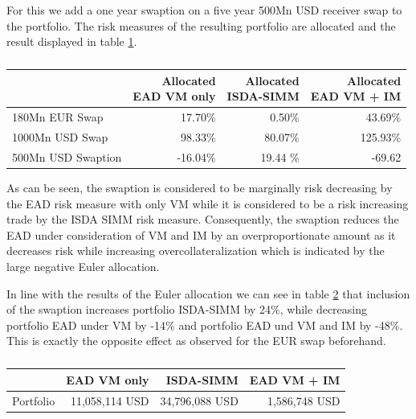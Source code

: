 \documentclass[../Thesis_AHoecherl.tex]{subfiles}
\begin{document}
    For this we add a one year swaption on a five year 500Mn USD receiver swap to the portfolio. The risk measures of the resulting portfolio are allocated and the result displayed in table \ref{tab:3TradeRatesAllocation}.

    \begin{table}[htbp]
        \centering
        \begin{tabular}{l||r|r|r}
                & \makecell{Allocated \\ EAD VM only} &\makecell{Allocated \\ ISDA-SIMM} &\makecell{Allocated \\ EAD VM + IM} \\
                \toprule
        180Mn EUR Swap & 17.70\% & 0.50\% & 43.69\% \\
        1000Mn USD Swap & 98.33\% & 80.07\% & 125.93\% \\
        500Mn USD Swaption & -16.04\% & 19.44 \% & -69.62\\
        \end{tabular}%
        \caption{}
        \label{tab:3TradeRatesAllocation}%
    \end{table}%
    As can be seen, the swaption is considered to be marginally risk decreasing by the EAD risk measure with only VM while it is considered to be a risk increasing trade by the ISDA SIMM risk measure. Consequently, the swaption reduces the EAD under consideration of VM and IM by an overproportionate amount as it decreases risk while increasing overcollateralization which is indicated by the large negative Euler allocation.

    In line with the results of the Euler allocation we can see in table \ref{tab:3TradeRatesResults} that inclusion of the swaption increases portfolio ISDA-SIMM by 24\%, while decreasing portfolio EAD under VM by -14\% and portfolio EAD und VM and IM by -48\%. This is exactly the opposite effect as observed for the EUR swap beforehand.

    \begin{table}[htbp]
        \centering
        \begin{tabular}{l||r|r|r}
                & EAD VM only &ISDA-SIMM & EAD VM + IM \\
                \toprule
        Portfolio & 11,058,114 USD & 34,796,088 USD & 1,586,748 USD \\
        \end{tabular}%
        \caption{}
        \label{tab:3TradeRatesResults}%
    \end{table}%
\end{document}

